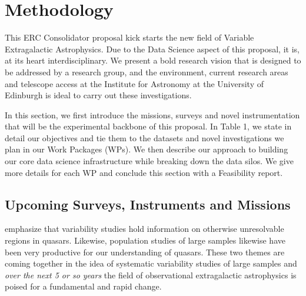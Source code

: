 
\section{Methodology}
\noindent
This ERC Consolidator proposal kick starts the new field of Variable
Extragalactic Astrophysics. Due to the Data Science aspect of this
proposal, it is, at its heart interdisciplinary.  We present a bold
research vision that is designed to be addressed by a research group,
and the environment, current research areas and telescope access at
the Institute for Astronomy at the University of Edinburgh is ideal to
carry out these investigations.  


\smallskip
\smallskip
\noindent
In this section, we first introduce the missions, surveys and novel
instrumentation that will be the experimental backbone of this
proposal. In Table 1, we state in detail our objectives and tie
them to the datasets and novel investigations we plan in our Work Packages
(WPs).  We then describe our approach to building our core data
science infrastructure while breaking down the data silos. We give more
details for each WP and conclude this section with a Feasibility
report.


\subsection{Upcoming Surveys, Instruments and Missions}
\noindent
\citep{Lawrence2016_ASPC} emphasize that variability studies hold
information on otherwise unresolvable regions in quasars. Likewise,
population studies of large samples likewise have been very productive
for our understanding of quasars. These two themes are coming together
in the idea of systematic variability studies of large samples and
{\it over the next 5 or so years} the field of observational
extragalactic astrophysics is poised for a fundamental and rapid
change.

